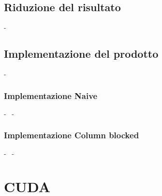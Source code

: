 \documentclass[compress]{beamer}
\begin{document}
\subsection{Riduzione del risultato}
\begin{frame}{\secname \text{ }- \subsecname\ }
\end{frame}

\subsection{Implementazione del prodotto}
\begin{frame}{\secname \text{ }- \subsecname\ }
\end{frame}

\subsubsection*{Implementazione Naive}
\begin{frame}{\secname \text{ }- \subsecname\ \text{ }- \subsubsecname}
\end{frame}

\subsubsection*{Implementazione Column blocked}
\begin{frame}{\secname \text{ }- \subsecname\ \text{ }- \subsubsecname}
\end{frame}

\section{CUDA}

\begin{frame}{\secname}
\end{frame}
\end{document}
